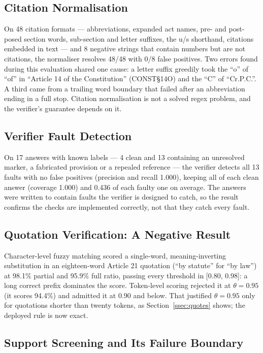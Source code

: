 \documentclass[conference]{IEEEtran}
\begin{document}
\subsection{Citation Normalisation}

On 48 citation formats --- abbreviations, expanded act names, pre- and post-posed section words, sub-section and letter suffixes, the u/s shorthand, citations embedded in text --- and 8 negative strings that contain numbers but are not citations, the normaliser resolves 48/48 with 0/8 false positives. Two errors found during this evaluation shared one cause: a letter suffix greedily took the ``o'' of ``of'' in ``Article 14 of the Constitution'' (CONST\S14O) and the ``C'' of ``Cr.P.C.''. A third came from a trailing word boundary that failed after an abbreviation ending in a full stop. Citation normalisation is not a solved regex problem, and the verifier's guarantee depends on it.

\subsection{Verifier Fault Detection}

On 17 answers with known labels --- 4 clean and 13 containing an unresolved marker, a fabricated provision or a repealed reference --- the verifier detects all 13 faults with no false positives (precision and recall 1.000), keeping all of each clean answer (coverage 1.000) and 0.436 of each faulty one on average. The answers were written to contain faults the verifier is designed to catch, so the result confirms the checks are implemented correctly, not that they catch every fault.

\subsection{Quotation Verification: A Negative Result}

Character-level fuzzy matching scored a single-word, meaning-inverting substitution in an eighteen-word Article 21 quotation (``by statute'' for ``by law'') at 98.1\% partial and 95.9\% full ratio, passing every threshold in [0.80, 0.98]: a long correct prefix dominates the score. Token-level scoring rejected it at $\theta = 0.95$ (it scores 94.4\%) and admitted it at 0.90 and below. That justified $\theta = 0.95$ only for quotations shorter than twenty tokens, as Section~\ref{ssec:quotes} shows; the deployed rule is now exact.

\subsection{Support Screening and Its Failure Boundary}
\end{document}
